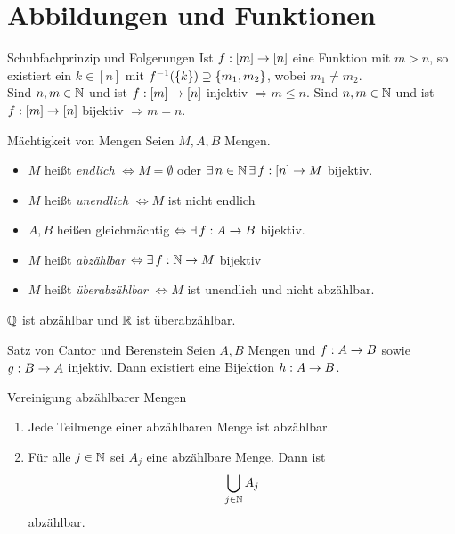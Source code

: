 \documentclass[main.tex]{subfiles}
\begin{document}
\section*{Abbildungen und Funktionen}
\begin{karte}{Schubfachprinzip und Folgerungen}
    Ist \( f : [m] \rightarrow [n] \) eine Funktion mit 
    \( m > n \), so existiert ein \( k \in [n] \) mit 
    \( f^{-1}(\{k\}) \supseteq \{m_1, m_2\}  \), 
    wobei \( m_1 \neq m_2 \).\\
    Sind \( n,m \in \mathbb{N} \) und ist \( f : [m] \rightarrow [n] \) injektiv 
    \( \Rightarrow m \leq n \).
    Sind \( n,m \in \mathbb{N} \) und ist \( f : [m] \rightarrow [n] \) bijektiv 
    \( \Rightarrow m = n \).
\end{karte}
\begin{karte}{Mächtigkeit von Mengen}
    Seien \( M, A, B \) Mengen.
    \begin{itemize}
        \item \( M \) heißt \textit{endlich} \( \Leftrightarrow 
        M = \emptyset \) oder \( \exists n \in \N \, \exists 
        \abb{f}{[n]}{M} \) bijektiv.
        \item \( M \) heißt \textit{unendlich} 
        \(\Leftrightarrow M \) ist nicht endlich 
        \item \( A, B \) heißen gleichmächtig \( \Leftrightarrow 
        \exists \abb{f}{A}{B} \) bijektiv.
        \item \(M\) heißt \textit{abzählbar} 
        \( \Leftrightarrow \exists \abb{f}{\N}{M} \) bijektiv
        \item \( M \) heißt \textit{überabzählbar} \( \Leftrightarrow 
        M \) ist unendlich und nicht abzählbar.
    \end{itemize}
    \( \mathbb{Q} \) ist abzählbar und \( \mathbb{R} \) ist überabzählbar.
\end{karte}
\begin{karte}{Satz von Cantor und Berenstein}
    Seien \(A, B \) Mengen und \( f : A \rightarrow B \) 
    sowie \( g : B \rightarrow A \) injektiv.
	Dann existiert eine Bijektion \( h : A \rightarrow B \).
\end{karte}
\begin{karte}{Vereinigung abzählbarer Mengen}
    \begin{enumerate}
		\item Jede Teilmenge einer abzählbaren Menge ist abzählbar.
        \item Für alle \(j \in \mathbb{N} \) sei \(A_j \) 
        eine abzählbare Menge. Dann ist 
        \[ \bigcup_{j \in \mathbb{N}}{A_j} \] abzählbar.
	\end{enumerate}
\end{karte}
\end{document}
